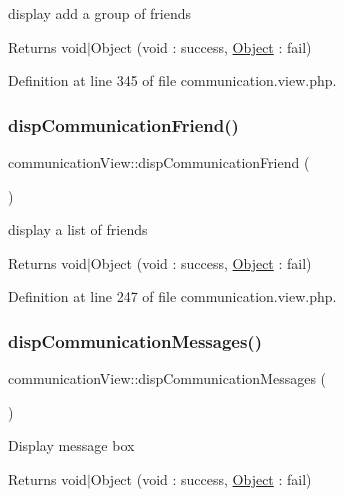 display add a group of friends \begin{DoxyReturn}{Returns}
void$\vert$\+Object (void \+: success, \hyperlink{classObject}{Object} \+: fail) 
\end{DoxyReturn}


Definition at line 345 of file communication.\+view.\+php.

\hypertarget{classcommunicationView_a676e4e4ab5900c536557befbbde6a88a}{}\label{classcommunicationView_a676e4e4ab5900c536557befbbde6a88a} 
\subsubsection{\texorpdfstring{disp\+Communication\+Friend()}{dispCommunicationFriend()}}
{\footnotesize\ttfamily communication\+View\+::disp\+Communication\+Friend (\begin{DoxyParamCaption}{ }\end{DoxyParamCaption})}

display a list of friends \begin{DoxyReturn}{Returns}
void$\vert$\+Object (void \+: success, \hyperlink{classObject}{Object} \+: fail) 
\end{DoxyReturn}


Definition at line 247 of file communication.\+view.\+php.

\hypertarget{classcommunicationView_af3af3334ae9f2e3a7809fe5b4957bc2b}{}\label{classcommunicationView_af3af3334ae9f2e3a7809fe5b4957bc2b} 
\subsubsection{\texorpdfstring{disp\+Communication\+Messages()}{dispCommunicationMessages()}}
{\footnotesize\ttfamily communication\+View\+::disp\+Communication\+Messages (\begin{DoxyParamCaption}{ }\end{DoxyParamCaption})}

Display message box \begin{DoxyReturn}{Returns}
void$\vert$\+Object (void \+: success, \hyperlink{classObject}{Object} \+: fail) 
\end{DoxyReturn}


